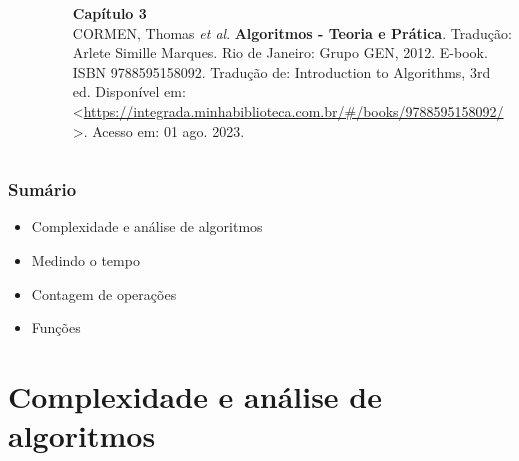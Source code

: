 \documentclass[aspectratio=169]{beamer}
\begin{document}
\begin{frame}
\begin{columns}[T]
\begin{column}{0.15\linewidth}
\vspace{-3mm}
\begin{figure}[h]
	\centering
	\includegraphics[height=0.3\paperheight]{imagens/livro_cormen.jpg}
\end{figure}
\end{column}
\begin{column}{0.85\linewidth}
\vspace{3mm}
\textbf{Capítulo 3}\\
\scriptsize{CORMEN, Thomas \emph{et al}. \textbf{Algoritmos - Teoria e Prática}. Tradução: Arlete Simille Marques. Rio de Janeiro: Grupo GEN, 2012. E-book. ISBN 9788595158092. Tradução de: Introduction to Algorithms, 3rd ed. Disponível em: \textless{}\url{https://integrada.minhabiblioteca.com.br/\#/books/9788595158092/}\textgreater{}. Acesso em: 01 ago. 2023.}
\end{column}
\end{columns}

\end{frame}

\begin{frame}\frametitle{Sumário}
\begin{itemize}
	\item Complexidade e análise de algoritmos
	\item Medindo o tempo
	\item Contagem de operações
	\item Funções
\end{itemize}
\end{frame}

\section{Complexidade e análise de algoritmos}
\end{document}
